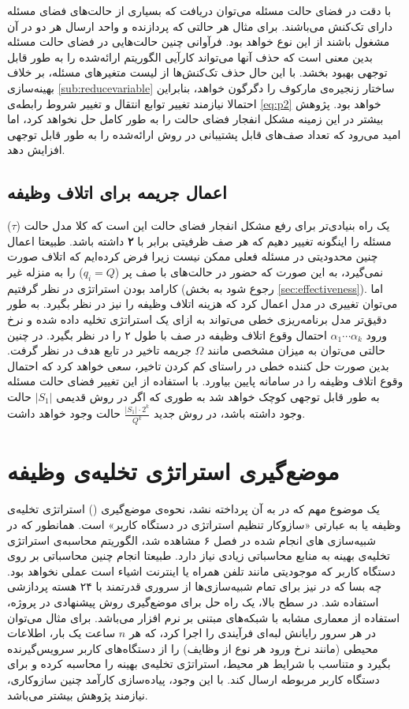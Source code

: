  با دقت در فضای حالت مسئله می‌توان دریافت که بسیاری از حالت‌های فضای مسئله دارای تک‌کنش می‌باشند. برای مثال هر حالتی که پردازنده و واحد ارسال هر دو در آن مشغول باشند از این نوع خواهد بود. فرآوانی چنین حالت‌هایی در فضای حالت مسئله بدین معنی است که حذف آنها می‌تواند کارآیی الگوریتم ارائه‌شده را به طور قابل توجهی بهبود بخشد. با این حال حذف تک‌کنش‌ها از لیست متغیرهای مسئله، بر خلاف بهینه‌سازی \ref{sub:reducevariable} ساختار زنجیره‌ی مارکوف را دگرگون خواهد، بنابراین احتمالا نیازمند تغییر توابع انتقال و تغییر شروط رابطه‌ی \ref{eq:p2} خواهد بود. پژوهش بیشتر در این زمینه مشکل انفجار فضای حالت را به طور کامل حل نخواهد کرد، اما امید می‌رود که تعداد صف‌های قابل پشتیبانی در روش ارائه‌شده را به طور قابل توجهی افزایش دهد.

\subsection{اعمال جریمه برای اتلاف وظیفه}
یک راه بنیادی‌تر برای رفع مشکل انفجار فضای حالت این است که کلا مدل حالت ($\tau$) مسئله را اینگونه تغییر دهیم که هر صف ظرفیتی برابر با \textbf{۲} داشته باشد. طبیعتا اعمال چنین محدودیتی در مسئله فعلی ممکن نیست زیرا فرض کرده‌ایم که اتلاف صورت نمی‌گیرد، به این صورت که حضور در حالت‌های با صف پر ($q_i = Q$) را به منزله غیر کارامد بودن استراتژی در نظر گرفتیم (رجوع شود به بخش \ref{sec:effectiveness}). اما می‌توان تغییری در مدل اعمال کرد که هزینه اتلاف وظیفه را نیز در نظر بگیرد. به طور دقیق‌تر مدل برنامه‌ریزی خطی می‌تواند به ازای یک استراتژی تخلیه داده شده و نرخ ورود $\alpha_1 \cdots \alpha_k$ احتمال وقوع اتلاف وظیفه در صف با طول ۲ را در نظر بگیرد. در چنین حالتی می‌توان به میزان مشخصی مانند $\Omega$ جریمه تاخیر در تابع هدف در نظر گرفت. بدین صورت حل کننده خطی در راستای کم کردن تاخیر، سعی خواهد کرد که احتمال وقوع اتلاف وظیفه را در سامانه پایین بیاورد. با استفاده از این تغییر فضای حالت مسئله به طور قابل توجهی کوچک خواهد شد به طوری که اگر در روش قدیمی $|S_1|$ حالت وجود داشته باشد، در روش جدید 
$\frac{|S_1| \cdot 2^k}{Q^k}$ 
حالت وجود خواهد داشت.
\section{موضع‌گیری استراتژی تخلیه‌ی وظیفه}
یک موضوع مهم که در \CurrentProject به آن پرداخته نشد، نحوه‌ی موضع‌گیری () استراتژی تخلیه‌ی وظیفه یا به عبارتی «سازوکار تنظیم استراتژی در دستگاه کاربر» است. همانطور که در شبیه‌سازی های انجام شده در فصل ۶ مشاهده شد، الگوریتم محاسبه‌ی استراتژی تخلیه‌ی بهینه به منابع محاسباتی زیادی نیاز دارد. طبیعتا انجام چنین محاسباتی بر روی دستگاه کاربر که موجودیتی مانند تلفن همراه یا اینترنت اشیاء است عملی نخواهد بود. چه بسا که در \CurrentProject نیز برای تمام شبیه‌سازی‌ها از سروری قدرتمند با ۲۴ هسته پردازشی استفاده شد. در سطح بالا، یک راه حل برای موضع‌گیری روش پیشنهادی در پروژه، استفاده از معماری مشابه با شبکه‌های مبتنی بر نرم افزار می‌باشد. برای مثال می‌توان در هر سرور رایانش لبه‌ای فرآیندی را اجرا کرد، که هر $n$ ساعت یک بار، اطلاعات محیطی (مانند نرخ ورود هر نوع از وظایف) را از دستگاه‌های کاربر سرویس‌گیرنده بگیرد و متناسب با شرایط هر محیط، استراتژی تخلیه‌ی بهینه را محاسبه کرده و برای دستگاه کاربر مربوطه ارسال کند. با این وجود، پیاده‌سازی کارآمد چنین سازوکاری، نیازمند پژوهش بیشتر می‌باشد.
\clearpage